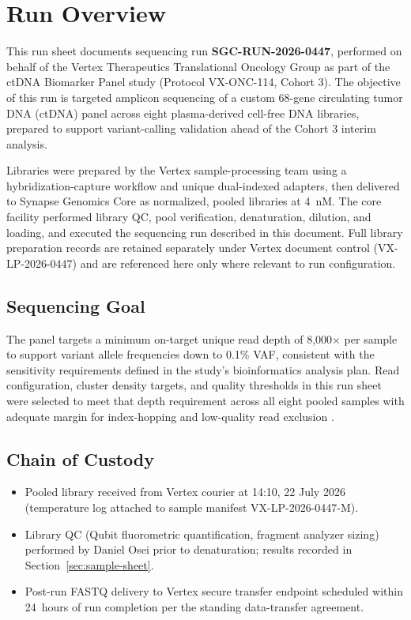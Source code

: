 \section{Run Overview}

This run sheet documents sequencing run \textbf{SGC-RUN-2026-0447}, performed on behalf of the
Vertex Therapeutics Translational Oncology Group as part of the ctDNA Biomarker Panel study
(Protocol VX-ONC-114, Cohort 3). The objective of this run is targeted amplicon sequencing of
a custom 68-gene circulating tumor DNA (ctDNA) panel across eight plasma-derived cell-free DNA
libraries, prepared to support variant-calling validation ahead of the Cohort 3 interim
analysis.

Libraries were prepared by the Vertex sample-processing team using a hybridization-capture
workflow and unique dual-indexed adapters, then delivered to Synapse Genomics Core as
normalized, pooled libraries at 4~nM. The core facility performed library QC, pool
verification, denaturation, dilution, and loading, and executed the sequencing run described
in this document. Full library preparation records are retained separately under Vertex
document control (VX-LP-2026-0447) and are referenced here only where relevant to run
configuration.

\subsection{Sequencing Goal}

The panel targets a minimum on-target unique read depth of 8{,}000$\times$ per sample to
support variant allele frequencies down to 0.1\% VAF, consistent with the sensitivity
requirements defined in the study's bioinformatics analysis plan. Read configuration, cluster
density targets, and quality thresholds in this run sheet were selected to meet that depth
requirement across all eight pooled samples with adequate margin for index-hopping and
low-quality read exclusion \cite{Illumina2017IndexHopping,Ewels2016MultiQC}.

\subsection{Chain of Custody}

\begin{itemize}[leftmargin=1.4em, itemsep=2pt]
  \item Pooled library received from Vertex courier at 14:10, 22 July 2026 (temperature log
  attached to sample manifest VX-LP-2026-0447-M).
  \item Library QC (Qubit fluorometric quantification, fragment analyzer sizing) performed by
  Daniel Osei prior to denaturation; results recorded in Section~\ref{sec:sample-sheet}.
  \item Post-run FASTQ delivery to Vertex secure transfer endpoint scheduled within 24~hours of
  run completion per the standing data-transfer agreement.
\end{itemize}
